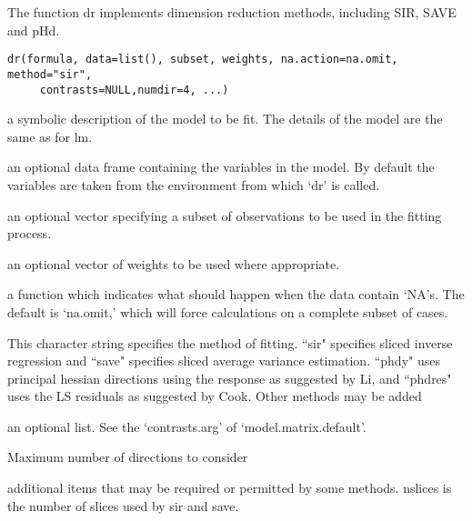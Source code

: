 \begin{Description}\relax
The function dr implements dimension reduction methods, including SIR, SAVE and pHd.\end{Description}
\begin{Usage}
\begin{verbatim}
dr(formula, data=list(), subset, weights, na.action=na.omit, method="sir", 
     contrasts=NULL,numdir=4, ...)
 \end{verbatim}
\end{Usage}
\begin{Arguments}
\begin{ldescription}
\item[\code{formula}] a symbolic description of the model to be fit. The details of
the model are the same as for lm. 
\item[\code{data}] an optional data frame containing the variables in the model.
By default the variables are taken from the environment from
which `dr' is called.
\item[\code{subset}] an optional vector specifying a subset of observations to be
used in the fitting process.
\item[\code{weights}] an optional vector of weights to be used where appropriate.
\item[\code{na.action}] a function which indicates what should happen when the data
contain `NA's.  The default is `na.omit,' which will force
calculations on a complete subset of cases.
\item[\code{method}] This character string specifies the method of fitting.  ``sir"
specifies sliced inverse regression and ``save" specifies sliced
average variance estimation.  ``phdy" uses principal hessian
directions using the response as suggested by Li, and ``phdres" 
uses the LS residuals as suggested by Cook. Other methods may be
added
\item[\code{contrasts}] an optional list. See the `contrasts.arg' of
`model.matrix.default'.
\item[\code{numdir}] Maximum number of directions to consider
\item[\code{...}] additional items that may be required or permitted by some 
methods.
nslices is the number of slices used by sir and save.
\end{ldescription}
\end{Arguments}
